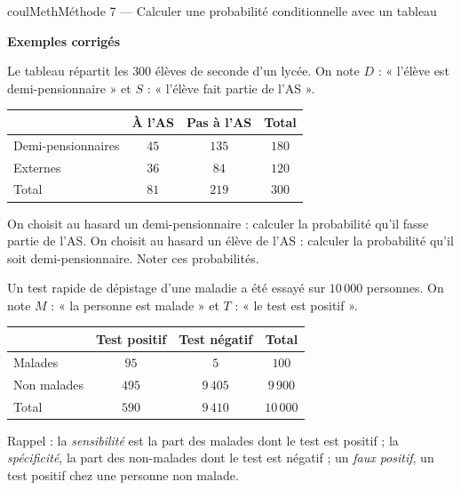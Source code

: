 \documentclass[11pt,a4paper]{article}
\makeatletter
\newcounter{lycee@signet}
\newcommand{\signet}[3][]{\stepcounter{lycee@signet}%
  \edef\lycee@dest{\if\relax\detokenize{#1}\relax
    signet.\arabic{lycee@signet}\else#1\fi}%
  \hypertarget{\lycee@dest}{}\bookmark[level=#2,dest=\lycee@dest]{#3}}
\newcounter{methode}
\newenvironment{methodebox}[1][Méthode]{\stepcounter{methode}%
  \begin{boitecours}[phantom={\signet[methode-\arabic{methode}]{2}{#1}}]{coulMeth}{#1}}%
  {\end{boitecours}}
\newcommand{\etape}[1]{\par\smallskip\textbf{\color{coulMeth}#1}\par\nobreak\smallskip}
\newcommand{\etapeexemples}{\etape{Exemples corrigés}}
\makeatother
\begin{document}
\begin{methodebox}[Méthode 7 --- Calculer une probabilité conditionnelle avec un tableau]
\etapeexemples
\begin{questions}[label=\alph*)]
  \item Le tableau répartit les $300$ élèves de seconde d'un lycée. On note $D$ :
    « l'élève est demi-pensionnaire » et $S$ : « l'élève fait partie de l'AS ».
    \begin{center}
    \renewcommand{\arraystretch}{1.5}
    \begin{tabular}{|l|c|c|c|}
    \hline
     & À l'AS & Pas à l'AS & Total \\
    \hline
    Demi-pensionnaires & $45$ & $135$ & $180$ \\
    \hline
    Externes & $36$ & $84$ & $120$ \\
    \hline
    Total & $81$ & $219$ & $300$ \\
    \hline
    \end{tabular}
    \end{center}
    On choisit au hasard un demi-pensionnaire : calculer la probabilité qu'il fasse
    partie de l'AS. On choisit au hasard un élève de l'AS : calculer la probabilité
    qu'il soit demi-pensionnaire. Noter ces probabilités.
  \item Un test rapide de dépistage d'une maladie a été essayé sur $10\,000$
    personnes. On note $M$ : « la personne est malade » et $T$ : « le test est
    positif ».
    \begin{center}
    \renewcommand{\arraystretch}{1.5}
    \begin{tabular}{|l|c|c|c|}
    \hline
     & Test positif & Test négatif & Total \\
    \hline
    Malades & $95$ & $5$ & $100$ \\
    \hline
    Non malades & $495$ & $9\,405$ & $9\,900$ \\
    \hline
    Total & $590$ & $9\,410$ & $10\,000$ \\
    \hline
    \end{tabular}
    \end{center}
    Rappel : la \emph{sensibilité} est la part des malades dont le test est positif ;
    la \emph{spécificité}, la part des non-malades dont le test est négatif ; un
    \emph{faux positif}, un test positif chez une personne non malade.


\end{questions}
\end{methodebox}
\end{document}
